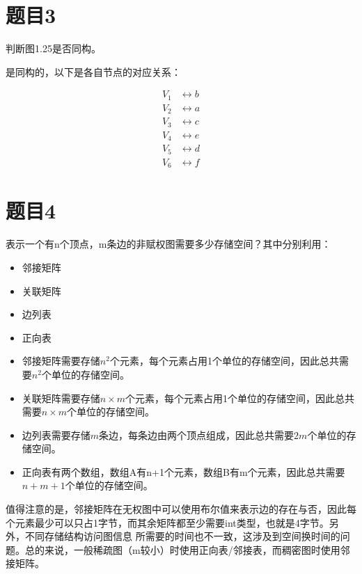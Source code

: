 \documentclass[utf8]{ctexart}
\theoremstyle{mystyle}
\begin{document}
\section*{题目3}
\begin{problembox}
  判断图1.25是否同构。
\end{problembox}
是同构的，以下是各自节点的对应关系：

\[
\begin{aligned}
  V_1 &\leftrightarrow b \\
  V_2 &\leftrightarrow a \\
  V_3 &\leftrightarrow c \\
  V_4 &\leftrightarrow e \\
  V_5 &\leftrightarrow d \\
  V_6 &\leftrightarrow f
\end{aligned}
\]
\section*{题目4}
\begin{problembox}
  表示一个有n个顶点，m条边的非赋权图需要多少存储空间？其中分别利用：
  \begin{itemize}
    \item 邻接矩阵
    \item 关联矩阵
    \item 边列表
    \item 正向表
  \end{itemize}
\end{problembox}
\begin{itemize}
  \item 邻接矩阵需要存储$n^2$个元素，每个元素占用1个单位的存储空间，因此总共需要$n^2$个单位的存储空间。
  \item 关联矩阵需要存储$n \times m$个元素，每个元素占用1个单位的存储空间，因此总共需要$n \times m$个单位的存储空间。
  \item 边列表需要存储$m$条边，每条边由两个顶点组成，因此总共需要$2m$个单位的存储空间。
  \item 正向表有两个数组，数组A有n+1个元素，数组B有m个元素，因此总共需要$n+m+1$个单位的存储空间。
\end{itemize}
值得注意的是，邻接矩阵在无权图中可以使用布尔值来表示边的存在与否，因此每个元素最少可以只占1字节，而其余矩阵都至少需要int类型，也就是4字节。另外，不同存储结构访问图信息
所需要的时间也不一致，这涉及到空间换时间的问题。总的来说，一般稀疏图（m较小）时使用正向表/邻接表，而稠密图时使用邻接矩阵。
\end{document}
